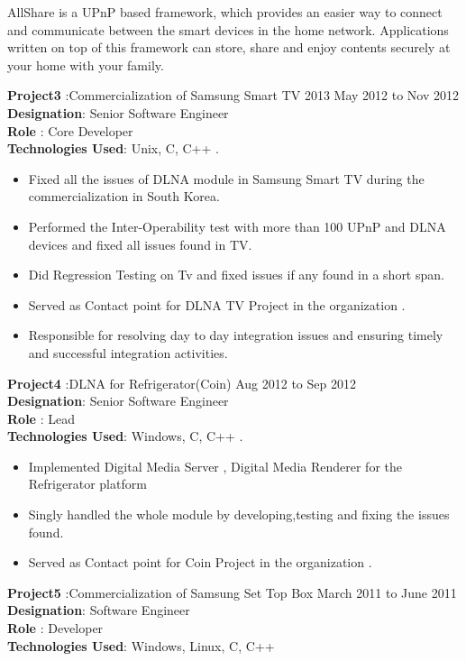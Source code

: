 \documentclass{resumeclass}
\begin{document}
\begin{resume}
AllShare is a UPnP based framework, which provides an easier way to connect and communicate between the smart devices in the home network. Applications written on top of this framework can store, share and enjoy contents securely at your home with your family.

\textbf{Project3} :Commercialization of Samsung Smart TV 2013 \hfill      May 2012 to Nov 2012 \\
\textbf{Designation}: Senior Software Engineer\\
\textbf{Role} : Core Developer\\
\textbf{Technologies Used}: Unix, C, C++ .

 \begin{itemize} \itemsep -2pt
  \item  Fixed all the issues of DLNA module in Samsung Smart TV during the commercialization in South Korea.
  \item  Performed the Inter-Operability test with more than 100 UPnP and DLNA devices and fixed all issues found in TV.
  \item  Did Regression Testing on Tv and fixed issues if any found in a short span.
  \item  Served as Contact point for DLNA TV Project in the organization .
  \item Responsible for resolving day to day integration issues and ensuring timely and successful integration activities.
\end{itemize} \vspace{-6pt}

\textbf{Project4} :DLNA for Refrigerator(Coin) \hfill    Aug 2012 to Sep 2012 \\
\textbf{Designation}: Senior Software Engineer\\
\textbf{Role} : Lead \\
\textbf{Technologies Used}: Windows, C, C++ .

 \begin{itemize} \itemsep -2pt
  \item  Implemented Digital Media Server , Digital Media Renderer for the Refrigerator platform  
  \item  Singly handled the whole module by developing,testing and fixing the issues found.
  \item  Served as Contact point for Coin Project in the organization .
\end{itemize} \vspace{-6pt}

\textbf{Project5} :Commercialization of Samsung Set Top Box \hfill    March 2011 to June 2011 \\
\textbf{Designation}: Software Engineer\\
\textbf{Role} : Developer \\
\textbf{Technologies Used}: Windows, Linux, C, C++ 


\end{resume}
\end{document}
